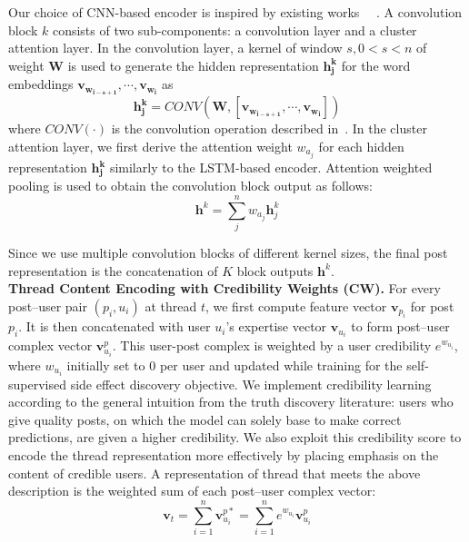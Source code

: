 \documentclass{bmcart}
\begin{document}
Our choice of CNN-based encoder is inspired by existing works
~\cite{kim2014convolutional}~\cite{yin2016abcnn}. A convolution block $k$ consists of two sub-components: a convolution layer and a cluster attention layer. In the convolution layer, a kernel of window $s, 0 < s < n$ of weight $\boldsymbol{W}$ is used to generate the hidden representation $\boldsymbol{h^k_j}$ for the word embeddings
$\boldsymbol{v_{w_{i-s+1}}},\cdots,\boldsymbol{v_{w_i}}$ as 
\begin{equation}
    \boldsymbol{h^k_j} = CONV(\boldsymbol{W}, [\boldsymbol{v_{w_{i-s+1}}},\cdots,\boldsymbol{v_{w_i}}])
\end{equation} 
where $CONV(\cdot)$ is the convolution operation described in~\cite{kim2014convolutional}. In the cluster attention layer, we first derive the attention weight $w_{a_j}$ for each hidden representation $\boldsymbol{h^k_j}$ similarly to the LSTM-based encoder. Attention weighted pooling is used to obtain the convolution block output as follows: 
\begin{equation}
    \boldsymbol{h}^k=\sum^n_j w_{a_j} \boldsymbol{h}^k_j
\end{equation}

Since we use multiple convolution blocks of different kernel sizes, the final post representation is the concatenation of $K$ block outputs $\boldsymbol{h}^k$. \\


\textbf{Thread Content Encoding with Credibility Weights (CW).}\label{sec:CW} For every post--user pair $\left(p_i, u_i\right)$ at thread $t$, we first compute 
feature vector $\boldsymbol{v}_{p_{i}}$ for post $p_{i}$. It is then concatenated with user $u_i$'s expertise vector $\boldsymbol{v}_{u_{i}}$
to form post--user complex vector $\boldsymbol{v}^{p}_{u_i}$. This
user-post complex is weighted by a user credibility $e^{w_{u_i}}$,
where $w_{u_i}$ initially set to 0 per user and updated while training for the self-supervised side effect discovery objective.
We implement credibility learning according to the general intuition from the truth discovery literature: users who give quality posts, on which the model can solely base to make correct predictions, are given a higher credibility. We also exploit this credibility score to encode the thread representation more effectively by placing emphasis on the content of credible users. A representation of thread that meets the above description is the weighted sum of each post--user complex vector:
\begin{equation}
\boldsymbol{v}_{t} = \sum^n_{i=1} \boldsymbol{v}^{p\ast}_{u_i} = \sum^n_{i=1} e^{w_{u_i}} \boldsymbol{v}^p_{u_i} 
\end{equation}
\end{document}
